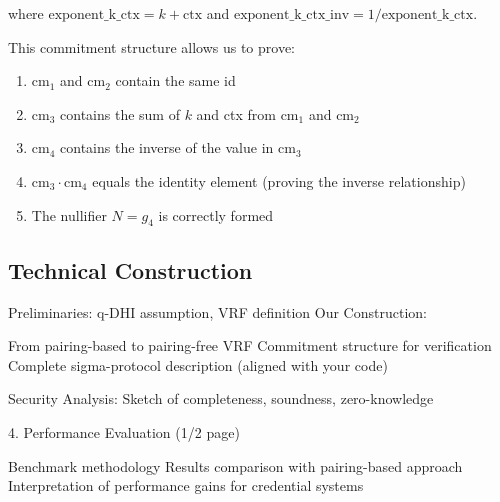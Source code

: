 where $\text{exponent\_k\_ctx} = k + \text{ctx}$ and $\text{exponent\_k\_ctx\_inv} = 1/\text{exponent\_k\_ctx}$.

This commitment structure allows us to prove:
\begin{enumerate}
    \item $\text{cm}_1$ and $\text{cm}_2$ contain the same id
    \item $\text{cm}_3$ contains the sum of $k$ and ctx from $\text{cm}_1$ and $\text{cm}_2$
    \item $\text{cm}_4$ contains the inverse of the value in $\text{cm}_3$
    \item $\text{cm}_3 \cdot \text{cm}_4$ equals the identity element (proving the inverse relationship)
    \item The nullifier $N = g_4$ is correctly formed
\end{enumerate}


































\subsection{Technical Construction}

Preliminaries: q-DHI assumption, VRF definition
Our Construction:

From pairing-based to pairing-free VRF
Commitment structure for verification
Complete sigma-protocol description (aligned with your code)


Security Analysis: Sketch of completeness, soundness, zero-knowledge







4. Performance Evaluation (1/2 page)

Benchmark methodology
Results comparison with pairing-based approach
Interpretation of performance gains for credential systems
























